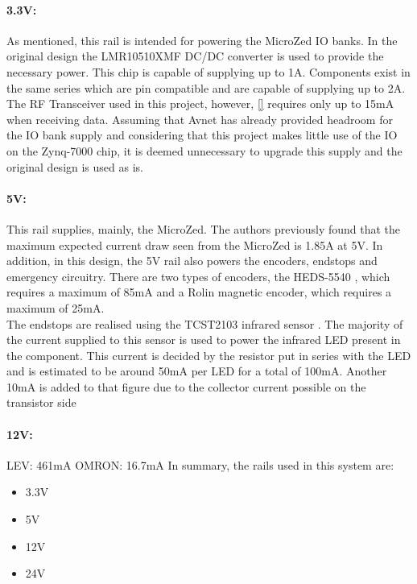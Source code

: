 \paragraph{3.3V:} %
\label{par:3_3v}
As mentioned, this rail is intended for powering the MicroZed IO banks.
In the original design the LMR10510XMF DC/DC converter is used to provide the necessary power.
This chip is capable of supplying up to 1A.
Components exist in the same series which are pin compatible and are capable of supplying up to 2A.
The RF Transceiver used in this project, however, \ref{} requires only up to 15mA when receiving data.
Assuming that Avnet has already provided headroom for the IO bank supply and considering that this project makes little use of the IO on the Zynq-7000 chip, it is deemed unnecessary to upgrade this supply and the original design is used as is.

\paragraph{5V:} %
\label{par:5v}
This rail supplies, mainly, the MicroZed.
The authors previously found \cite{isaswarm} that the maximum expected current draw seen from the MicroZed is 1.85A at 5V.
In addition, in this design, the 5V rail also powers the encoders, endstops and emergency circuitry.
There are two types of encoders, the HEDS-5540 \cite{heds5540}, which requires a maximum of 85mA and a Rolin magnetic encoder, which requires a maximum of 25mA.\\
The endstops are realised using the TCST2103 infrared sensor \cite{tcst2103}.
The majority of the current supplied to this sensor is used to power the infrared LED present in the component.
This current is decided by the resistor put in series with the LED and is estimated to be around 50mA per LED for a total of 100mA.
Another 10mA is added to that figure due to the collector current possible on the transistor side

\paragraph{12V:} %
\label{par:12v}
LEV: 461mA OMRON: 16.7mA
In summary, the rails used in this system are:
\begin{itemize}
	\item 3.3V
	\item 5V
	\item 12V
	\item 24V
\end{itemize}

